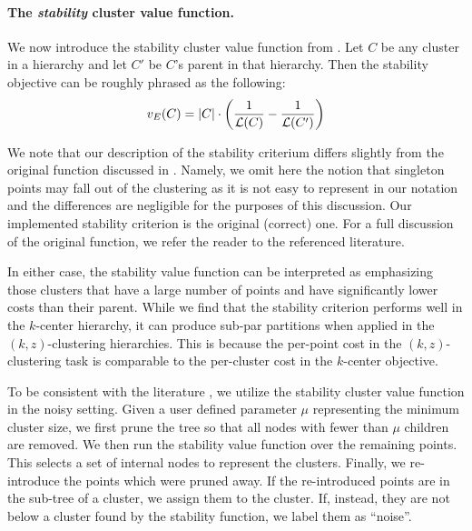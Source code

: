 

\paragraph{The \emph{stability} cluster value function.} 
We now introduce the stability cluster value function from \citet{hdbscan}. Let $C$ be any cluster in a hierarchy and let $C'$ be $C$'s parent in that hierarchy. Then the stability objective can be roughly phrased as the following:
\begin{equation}
    \label{eq:EoM}
    v_{E}(C) = |C| \cdot \left( \frac{1}{\mathcal{L}(C)} - \frac{1}{\mathcal{L}(C')} \right)\vspace*{-0.2cm}
\end{equation}

We note that our description of the stability criterium differs slightly from the original function discussed in \cite{hdbscan, hdbscan_long, acceleratedHDBSCAN}. Namely, we omit here the notion that singleton points may fall out of the clustering as it is not easy to represent in our notation and the differences are negligible for the purposes of this discussion. Our implemented stability criterion is the original (correct) one. For a full discussion of the original function, we refer the reader to the referenced literature.

In either case, the stability value function can be interpreted as emphasizing those clusters that have a large number of points and have significantly lower costs than their parent. While we find that the stability criterion performs well in the $k$-center hierarchy, it can produce sub-par partitions when applied in the $(k, z)$-clustering hierarchies. This is because the per-point cost in the $(k, z)$-clustering task is comparable to the per-cluster cost in the $k$-center objective. 

To be consistent with the literature \cite{hdbscan}, we utilize the stability cluster value function in the noisy setting. Given a user defined parameter $\mu$ representing the minimum cluster size, we first prune the tree so that all nodes with fewer than $\mu$ children are removed. We then run the stability value function over the remaining points. This selects a set of internal nodes to represent the clusters. Finally, we re-introduce the points which were pruned away. If the re-introduced points are in the sub-tree of a cluster, we assign them to the cluster. If, instead, they are not below a cluster found by the stability function, we label them as ``noise''.

